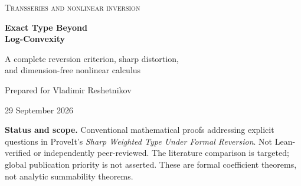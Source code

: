 \documentclass[11pt,a4paper]{article}
\numberwithin{equation}{section}
\theoremstyle{definition}
\theoremstyle{remark}
\begin{document}
\hypersetup{pageanchor=false}
\begin{titlepage}
\centering
\vspace*{11mm}
{\Large\scshape Transseries and nonlinear inversion\par}
\vspace{12mm}
{\Huge\bfseries Exact Type Beyond\\[3mm] Log-Convexity\par}
\vspace{9mm}
{\Large A complete reversion criterion, sharp distortion,\\[2mm]
and dimension-free nonlinear calculus\par}
\vspace{12mm}
{\large Prepared for Vladimir Reshetnikov\par}
\vspace{3mm}
29 September 2026
\vspace{11mm}
\begin{minipage}{0.91\textwidth}
\begin{abstract}
For an arbitrary positive coefficient weight $N=(N_n)$, we characterize
exact preservation of exponential coefficient type under every formal
compositional inverse. The criterion is superexponential root growth
\emph{together} with subexponential agreement with the least supermultiplicative
majorant
\[
 S_n=\max_{j_1+\cdots+j_k=n}\prod_{i=1}^{k}N_{j_i}.
\]
The central estimate is stronger: whenever $N_n^{1/n}\to\infty$, the
positive extremal inverse has coefficient $S_n\exp(o(n))$, for every
fixed positive input amplitude. Consequently
$\limsup(S_n/N_n)^{1/n}$ is the exact optimal multiplicative distortion
of type, not merely an upper bound.

For the zero-loss weights we prove a sharp composition inequality for two
divergent arguments, determine all possible cancellations at equal type,
and extend inversion and composition to formal Banach-space maps without
a dimension-dependent loss. Explicit oscillating weights show that
log-convex approximation is not necessary; other examples realize every
finite distortion and even send type zero to infinite type under inversion.
The proofs are self-contained after elementary formal-series algebra.
An exact finite verification program, a source audit, and a further
research program accompany the article.
\end{abstract}
\end{minipage}
\vfill
\begin{minipage}{0.91\textwidth}\small
\textbf{Status and scope.} Conventional mathematical proofs addressing
explicit questions in ProveIt's \emph{Sharp Weighted Type Under Formal
Reversion}. Not Lean-verified or independently peer-reviewed. The
literature comparison is targeted; global publication priority is not
asserted. These are formal coefficient theorems, not analytic summability
theorems.
\end{minipage}
\end{titlepage}
\end{document}
